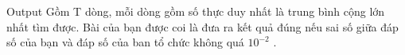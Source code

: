 Output
Gồm T dòng, mỗi dòng gồm số thực duy nhất là trung bình cộng lớn nhất tìm được. Bài của bạn được coi là đưa ra kết quả đúng nếu sai số giữa đáp số của bạn và đáp số của ban tổ chức không quá $10^{-2}$   .
